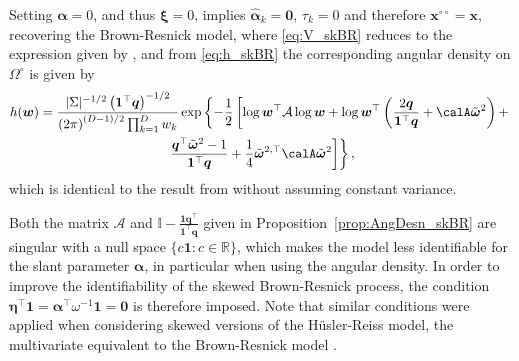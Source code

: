 \documentclass[12pt]{article}
\begin{document}
\begin{corollary}
\label{cor:BR}
Setting $\bm \alpha = 0$, and thus $\bm \xi=0$, implies $\hat{\bm \alpha}_k = \bm 0$, $\tau_k=0$ and therefore $\bm x^{\circ\circ} = \bm x$, recovering the Brown-Resnick model, where \eqref{eq:V_skBR} reduces to the expression given by \citet{Huser.Davison:2013a}, and from \eqref{eq:h_skBR} the corresponding angular density on $\Omega^\circ$ is given by
%
\begin{multline}
\label{eq:h_BR}
h(\bm w) =\frac{| \Sigma |^{-1/2} \left( \bm 1^\top \bm q\right)^{-1/2}}{\left( 2\pi \right)^{(D-1)/2}\prod_{k=1}^D w_k}\exp \left\{ -\frac{1}{2} \left[ \log \bm w^{\top} \mathcal{A} \log \bm w + \log \bm w^{\top} \left( \frac{2 \bm q}{\bm 1^\top \bm q} + \calA\tilde{\bm\omega}^2\right) + \right.\right. \\ \left.\left. \frac{\bm q^\top\tilde{\bm \omega}^2 - 1}{\bm 1 ^\top \bm q} + \frac{1}{4}\tilde{\bm\omega}^{2,\top}\calA\tilde{\bm\omega}^2 \right]\right\},
\end{multline}%
%
which is identical to the result from \citet{Wadsworth.Tawn:2014} without assuming constant variance.
\end{corollary}

Both the matrix $\mathcal{A}$ and $\mathbb{I} - \frac{\bm 1\bm q^\top}{\bm 1^\top \bm q}$ given in Proposition~\ref{prop:AngDesn_skBR} are singular with a null space $\{c\bm 1:c\in\mathbb R\}$, which makes the model less identifiable for the slant parameter $\bm \alpha$, in particular when using the angular density. In order to improve the identifiability of the skewed Brown-Resnick process, 
the condition $\bm \eta^\top \bm 1 = \bm \alpha^\top \omega^{-1}  \bm 1 = \bm 0$ is therefore imposed. Note that similar conditions were applied when considering skewed versions of the H\"{u}sler-Reiss model, the multivariate equivalent to the Brown-Resnick model \citep{Padoan:2011, Beranger.etal:2019}. 
\end{document}
